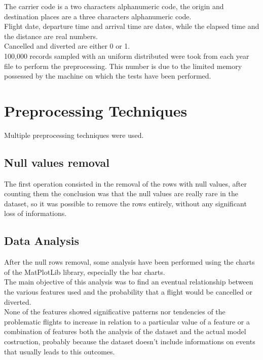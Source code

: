 \documentclass[
	letterpaper, %
	10pt, %
]{class}
\begin{document}
The carrier code is a two characters alphanumeric code, the origin and destination places are a three characters alphanumeric code.\\
Flight date, departure time and arrival time are dates, while the elapsed time and the distance are real numbers.\\
Cancelled and diverted are either 0 or 1.\\

100,000 records sampled with an uniform distributed were took from each year file to perform the preprocessing. This number is due to the limited memory
possessed by the machine on which the tests have been performed.


\section{Preprocessing Techniques}

Multiple preprocessing techniques were used.\\

\subsection{Null values removal}

The first operation consisted in the removal of the rows with null values, after counting them the conclusion was that the null values are really rare in the dataset, so it was possible to remove the rows entirely, without any significant loss of informations.\\

\subsection{Data Analysis}
After the null rows removal, some analysis have been performed using the charts of the MatPlotLib library, especially the bar charts.\\
The main objective of this analysis was to find an eventual relationship between the various features used and the probability that a flight would be cancelled or diverted.\\

None of the features showed significative patterns nor tendencies of the problematic flights to increase in relation to a particular value of a feature or a combination of features both the analysis of the dataset and the actual model costruction, probably because the dataset doesn't include informations on events that usually leads to this outcomes.\\
\end{document}
